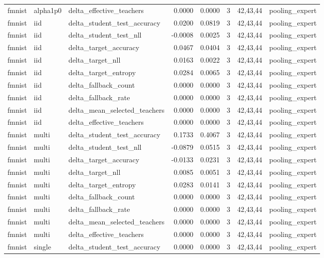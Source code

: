 \begin{tabular}{lllrrrll}
fmnist & alpha1p0 & delta\_effective\_teachers & 0.0000 & 0.0000 & 3 & 42,43,44 & pooling\_expert \\
fmnist & iid & delta\_student\_test\_accuracy & 0.0200 & 0.0819 & 3 & 42,43,44 & pooling\_expert \\
fmnist & iid & delta\_student\_test\_nll & -0.0008 & 0.0025 & 3 & 42,43,44 & pooling\_expert \\
fmnist & iid & delta\_target\_accuracy & 0.0467 & 0.0404 & 3 & 42,43,44 & pooling\_expert \\
fmnist & iid & delta\_target\_nll & 0.0163 & 0.0022 & 3 & 42,43,44 & pooling\_expert \\
fmnist & iid & delta\_target\_entropy & 0.0284 & 0.0065 & 3 & 42,43,44 & pooling\_expert \\
fmnist & iid & delta\_fallback\_count & 0.0000 & 0.0000 & 3 & 42,43,44 & pooling\_expert \\
fmnist & iid & delta\_fallback\_rate & 0.0000 & 0.0000 & 3 & 42,43,44 & pooling\_expert \\
fmnist & iid & delta\_mean\_selected\_teachers & 0.0000 & 0.0000 & 3 & 42,43,44 & pooling\_expert \\
fmnist & iid & delta\_effective\_teachers & 0.0000 & 0.0000 & 3 & 42,43,44 & pooling\_expert \\
fmnist & multi & delta\_student\_test\_accuracy & 0.1733 & 0.4067 & 3 & 42,43,44 & pooling\_expert \\
fmnist & multi & delta\_student\_test\_nll & -0.0879 & 0.0515 & 3 & 42,43,44 & pooling\_expert \\
fmnist & multi & delta\_target\_accuracy & -0.0133 & 0.0231 & 3 & 42,43,44 & pooling\_expert \\
fmnist & multi & delta\_target\_nll & 0.0085 & 0.0051 & 3 & 42,43,44 & pooling\_expert \\
fmnist & multi & delta\_target\_entropy & 0.0283 & 0.0141 & 3 & 42,43,44 & pooling\_expert \\
fmnist & multi & delta\_fallback\_count & 0.0000 & 0.0000 & 3 & 42,43,44 & pooling\_expert \\
fmnist & multi & delta\_fallback\_rate & 0.0000 & 0.0000 & 3 & 42,43,44 & pooling\_expert \\
fmnist & multi & delta\_mean\_selected\_teachers & 0.0000 & 0.0000 & 3 & 42,43,44 & pooling\_expert \\
fmnist & multi & delta\_effective\_teachers & 0.0000 & 0.0000 & 3 & 42,43,44 & pooling\_expert \\
fmnist & single & delta\_student\_test\_accuracy & 0.0000 & 0.0000 & 3 & 42,43,44 & pooling\_expert \\

\end{tabular}
